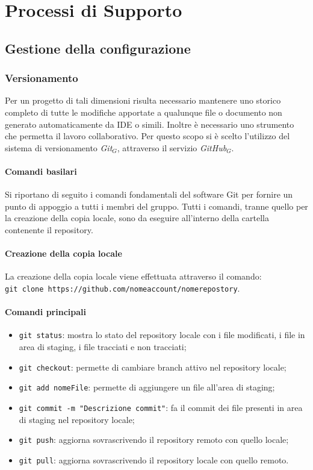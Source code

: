 \chapter{Processi di Supporto}\label{PdS}
\section{Gestione della configurazione}
\subsection{Versionamento}
Per un progetto di tali dimensioni risulta necessario mantenere uno storico completo di tutte le modifiche apportate a qualunque file o documento non generato automaticamente da IDE o simili. Inoltre è necessario uno strumento che permetta il lavoro collaborativo. Per questo scopo si è scelto l'utilizzo del sistema di versionamento \textit{Git$_{G}$}, attraverso il servizio \textit{GitHub$_{G}$}.
\subsubsection{Comandi basilari}
Si riportano di seguito i comandi fondamentali del software Git per fornire un punto di appoggio a tutti i membri del gruppo. Tutti i comandi, tranne quello per la creazione della copia locale, sono da eseguire all'interno della cartella contenente il repository.
\subsubsection{Creazione della copia locale}
La creazione della copia locale viene effettuata attraverso il comando:\\
\texttt{git clone https://github.com/nomeaccount/nomerepostory}.
\subsubsection{Comandi principali}
\begin{itemize}
	\item \texttt{git status}: mostra lo stato del repository locale con i file modificati, i file in area di staging, i file tracciati e non tracciati;
	\item \texttt{git checkout}: permette di cambiare branch attivo nel repository locale;
	\item \texttt{git add nomeFile}: permette di aggiungere un file all'area di staging;
	\item \texttt{git commit -m "Descrizione commit"}: fa il commit dei file presenti in area di staging nel repository locale;
	\item \texttt{git push}: aggiorna sovrascrivendo il repository remoto con quello locale;
	\item \texttt{git pull}: aggiorna sovrascrivendo il repository locale con quello remoto.
\end{itemize}
